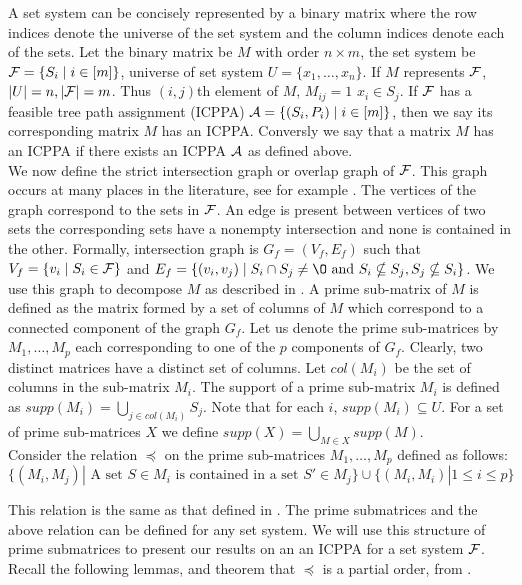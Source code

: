 \noindent
A set system can be concisely represented by a binary matrix where the
row indices denote the universe of the set system and the column
indices denote each of the sets. Let the binary matrix be $M$ with
order $n \times m$, the set system be ${\cal F} = \{S_i \mid i \in [m]\}$,
universe of set system $U = \{x_1, \dots ,x_n\}$. If $M$ represents
${\cal F}$, $|U| = n, |{\cal F}| = m$. Thus $(i,j)$th element of $M$, $M_{ij} =
1$ \iff $x_i \in S_j$. If ${\cal F}$ has a feasible tree path assignment
(ICPPA) ${\cal A} = \{(S_i,P_i) \mid i \in [m]\}$, then we say its
corresponding matrix $M$ has an ICPPA. Conversly we say that a matrix
$M$ has an ICPPA if there exists an ICPPA ${\cal A}$ as defined
above.\\
\noindent
We now define the strict intersection graph or overlap graph of
${\cal F}$. This graph occurs at many places in the literature, see for
example \cite{kklv10, wlh02, nsnrs09}.  The vertices of the graph
correspond to the sets in ${\cal F}$.  An edge is present between vertices
of two sets \iff the corresponding sets have a nonempty intersection
and none is contained in the other. Formally, intersection graph is
$G_f = (V_f, E_f)$ such that $V_f = \{v_i \mid S_i \in {\cal F}\}$ and $E_f
= \{(v_i, v_j) \mid S_i \cap S_j \ne \O \text{ and }S_i \nsubseteq
S_j, S_j \nsubseteq S_i \}$.  We use this graph to decompose $M$ as
described in \cite{wlh02,nsnrs09}.  A prime sub-matrix of $M$ is
defined as the matrix formed by a set of columns of $M$ which
correspond to a connected component of the graph $G_f$.  Let us denote
the prime sub-matrices by $M_1,\ldots,M_p$ each corresponding to one
of the $p$ components of $G_f$. Clearly, two distinct matrices have a
distinct set of columns.  Let $col(M_i)$ be the set of columns in the
sub-matrix $M_i$.  The support of a prime sub-matrix $M_i$ is defined
as $supp(M_i) = \displaystyle \bigcup_{j \in col(M_i)}S_j$.  Note that
for each $i$, $supp(M_i) \subseteq U$.  For a set of prime
sub-matrices $X$ we define
$supp(X) = \displaystyle \bigcup_{M \in X} supp(M)$. \\


\noindent
Consider the relation $\preccurlyeq$ on the prime sub-matrices $M_1,
\ldots, M_p$ defined as follows:
\begin{equation}
  \nonumber \{(M_i,M_j) | \mbox{ A set } S \in
  M_i \mbox{ is contained in a set } S' \in M_j\} \cup \{(M_i,M_i) | 1
  \leq i \leq p\} 
\end{equation}

\noindent
This relation is the same as that defined in \cite{nsnrs09}. The prime
submatrices and the above relation can be defined for any set
system. We will use this structure of prime submatrices to present our
results on an an ICPPA for a set system ${\cal F}$. Recall the following
lemmas, and theorem that $\preccurlyeq$ is a partial order, from
\cite{nsnrs09}.

